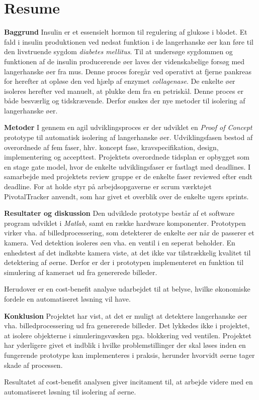 \section*{Resume}
\textbf{Baggrund}
Insulin er et essensielt hormon til regulering af glukose i blodet. Et fald i insulin produktionen ved nedsat funktion i de langerhanske øer kan føre til den livstruende sygdom \textit{diabetes mellitus}. Til at undersøge sygdommen og funktionen af de insulin producerende øer laves der videnskabelige forsøg med langerhanske øer fra mus. Denne proces foregår ved operativt at fjerne pankreas for herefter at opløse den ved hjælp af enzymet \textit{collagenase}. De enkelte øer isoleres herefter ved manuelt, at plukke dem fra en petriskål. Denne proces er både besværlig og tidskrævende. Derfor ønskes der nye metoder til isolering af langerhanske øer.

\textbf{Metoder} I gennem en agil udviklingsproces er der udviklet en \textit{Proof of Concept} prototype til automatisk isolering af langerhanske øer. Udviklingsfasen bestod af overordnede af fem faser, hhv. koncept fase, kravspecifikation, design, implementering og accepttest. Projektets overordnede tidsplan er opbygget som en stage gate model, hvor de enkelte udviklingsfaser er fastlagt med deadlines. I samarbejde med projektets review gruppe er de enkelte faser reviewed efter endt deadline. For at holde styr på arbejdsopgaverne er scrum værktøjet PivotalTracker anvendt, som har givet et overblik over de enkelte ugers sprints.

\textbf{Resultater og diskussion} Den udviklede prototype består af et software program udviklet i \textit{Matlab}, samt en række hardware komponenter. Prototypen virker vha. af billedprocessering, som detekterer de enkelte øer når de passerer et kamera. Ved detektion isoleres øen vha. en ventil i en seperat beholder. En enhedstest af det indkøbte kamera viste, at det ikke var tilstrækkelig kvalitet til detektering af øerne. Derfor er der i prototypen implementeret en funktion til simulering af kameraet ud fra genererede billeder.
 
Herudover er en cost-benefit analyse udarbejdet til at belyse, hvilke økonomiske fordele en automatiseret løsning vil have.   


\textbf{Konklusion} Projektet har vist, at det er muligt at detektere langerhanske øer vha. billedprocessering ud fra genererede billeder. Det lykkedes ikke i projektet, at isolere objekterne i simuleringsvæsken pga. blokkering ved ventilen. Projektet har yderligere givet et indblik i hvilke problemstillinger der skal løses inden en fungerende prototype kan implementeres i praksis, herunder hvorvidt øerne tager skade af processen. 

Resultatet af cost-benefit analysen giver incitament til, at arbejde videre med en automatiseret løsning til isolering af øerne. 



